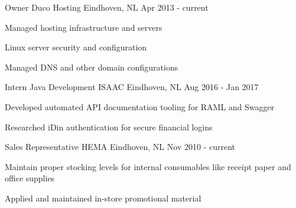 \vspace{2mm}

\begin{cventries}
\cventry
  {Owner} %
  {Duco Hosting} %
  {Eindhoven, NL} %
  {Apr 2013 - current} %
  {
    \begin{cvitems} %
      \item {Managed hosting infrastructure and servers}
      \item {Linux server security and configuration}
      \item {Managed DNS and other domain configurations}
    \end{cvitems}
  }
  \vspace{4mm}

  \cventry
    {Intern Java Development} %
    {ISAAC} %
    {Eindhoven, NL} %
    {Aug 2016 - Jan 2017} %
    {
      \begin{cvitems} %
        \item {Developed automated API documentation tooling for RAML and Swagger}
        \item {Researched iDin authentication for secure financial logins}
      \end{cvitems}
    }
    \vspace{4mm}

  \cventry
    {Sales Representative} %
    {HEMA} %
    {Eindhoven, NL} %
    {Nov 2010 - current} %
    {
      \begin{cvitems} %
        \item {Maintain proper stocking levels for internal consumables like receipt paper and office supplies}
        \item {Applied and maintained in-store promotional material}
      \end{cvitems}
    }

\end{cventries}
